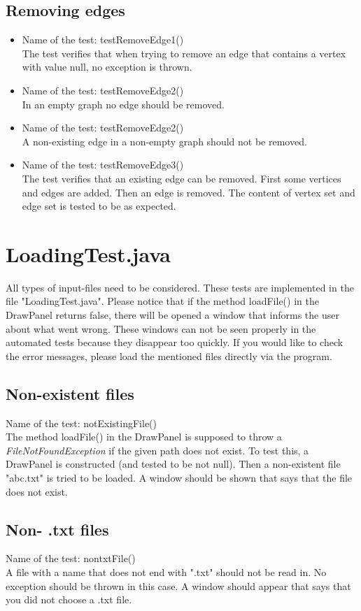 \documentclass{article}
\begin{document}
\subsection{Removing edges}
\begin{itemize}
	\item Name of the test: testRemoveEdge1()\\
	The test verifies that when trying to remove an edge that contains a vertex with value null, no exception is thrown.
	\item Name of the test: testRemoveEdge2()\\
	In an empty graph no edge should be removed.
	\item Name of the test: testRemoveEdge2()\\
	A non-existing edge in a non-empty graph should not be removed.	
	\item Name of the test: testRemoveEdge3()\\
	The test verifies that an existing edge can be removed. First some vertices and edges are added. Then an edge is removed. The content of vertex set and edge set is tested to be as expected.
\end{itemize}	

\section{LoadingTest.java}
All types of input-files need to be considered. These tests are implemented in the file "LoadingTest.java". Please notice that if the method loadFile() in the DrawPanel returns false, there will be opened a window that informs the user about what went wrong. These windows can not be seen properly in the automated tests because they disappear too quickly. If you would like to check the error messages, please load the mentioned files directly via the program.
\subsection{Non-existent files}
Name of the test: notExistingFile()\\
The method loadFile() in the DrawPanel is supposed to throw a \emph{FileNotFoundException} if the given path does not exist. To test this, a DrawPanel is constructed (and tested to be not null). Then a non-existent file  "abc.txt" is tried to be loaded. A window should be shown that says that the file does not exist.
\subsection{Non- .txt files}
Name of the test: nontxtFile()\\
A file with a name that does not end with ".txt" should not be read in. No exception should be thrown in this case. A window should appear that says that you did not choose a .txt file.
\end{document}
